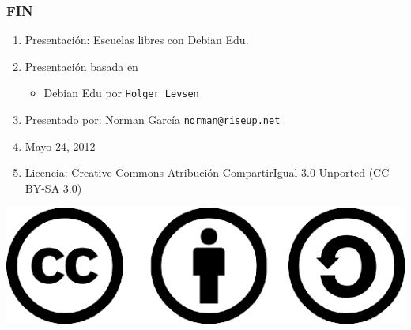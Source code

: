 \documentclass{beamer}
\begin{document}
\begin{frame}
\frametitle{FIN}
	\begin{enumerate}
		\pause \item Presentaci\'on: Escuelas libres con Debian Edu.
		\pause \item Presentaci\'on basada en
			\begin{itemize}
				\pause \item Debian Edu por \texttt{Holger Levsen}
			\end{itemize}
		\pause \item Presentado por: Norman Garc\'ia  \texttt{norman@riseup.net}
		\pause \item Mayo 24, 2012
		\pause \item Licencia: Creative Commons Atribuci\'on-CompartirIgual 3.0 Unported (CC BY-SA 3.0)
	\end{enumerate}

	\begin{center}
  		 \includegraphics[scale=0.20]{../img/cclogo.png}
	\end{center}

\end{frame}
\end{document}
